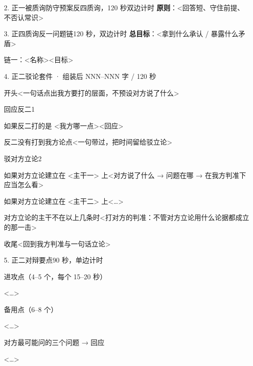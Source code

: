 \begin{stage}{2. 正一被质询防守预案}{反四质询，120 秒双边计时}
\textbf{原则}：<回答短、守住前提、不否认常识>
\begin{qa}
\end{qa}
\end{stage}

\begin{stage}{3. 正四质询反一问题链}{120 秒，双边计时}
\textbf{总目标}：<拿到什么承认 / 暴露什么矛盾>
\begin{chain}{链一：<名称>}{<目标>}
\end{chain}
\end{stage}

\begin{kit}{4. 正二驳论}{套件 · 组装后 NNN–NNN 字 / 120 秒}
\begin{fixed}{开头}<一句话点出我方要打的层面，不预设对方说了什么>\end{fixed}
\begin{pick}{回应反二}{1}
\begin{module}{如果反二打的是 <我方哪一点>}<回应>\end{module}
\begin{fallback}{反二没有打到我方论点}<一句带过，把时间留给驳立论>\end{fallback}
\end{pick}
\begin{pick}{驳对方立论}{2}
\begin{module}{如果对方立论建立在 <主干一> 上}<对方说了什么 → 问题在哪 → 在我方判准下应当怎么看>\end{module}
\begin{module}{如果对方立论建立在 <主干二> 上}<…>\end{module}
\begin{fallback}{对方立论的主干不在以上几条时}<打对方的判准：不管对方立论用什么论据都成立的那一击>\end{fallback}
\end{pick}
\begin{fixed}{收尾}<回到我方判准与一句话立论>\end{fixed}
\end{kit}

\begin{stage}{5. 正二对辩要点}{90 秒，单边计时}
\begin{points}{进攻点（4–5 个，每个 15–20 秒）}
\item <…>
\end{points}
\begin{points}{备用点（6–8 个）}
\item <…>
\end{points}
\begin{points}{对方最可能问的三个问题 → 回应}
\item <…>
\end{points}
\end{stage}

